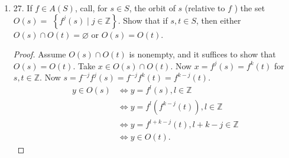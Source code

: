 \begin{enumerate}[resume]
\begin{lemma}
	\begin{proof}[Proof of lemma]
	We pick an element $x \in S$ and find a closed orbit \[
	R_f(x) := \{f^k x: k \in \mathbb{Z}, k \ge 0\} \subset S
	.\] 
	$R_f(x)$ is nonempty since $x \in R_f(x)$. We may repeat the process with $S\setminus R_f(x)$ instead of $S$. The process must terminate because $S$ is finite and we take away at least one element in each repetition.
 	\end{proof}
	\end{lemma}
	\begin{lemma}
	For any element $f$ in $A(R)$ where $|R| = n$, if $R$ is a closed orbit wrt $f$, $f$ can be decomposed into product of precisely $n-1$ transpositions.
	\begin{proof}[Proof of lemma]
	Fix some $x \in R$, and make the list
	\[
		\left( x, fx, f^2 x, \ldots, f^{n-1}x \right)
	.\]
	By properties of closed orbit, this is an exhaustive list of elements in $R$. Now we perform these $n-1$ transpositions sequentially:
	\[
		\left( 1\leftrightarrow 2 \right),
		\left( 1\leftrightarrow 3 \right),
		\ldots,
		\left( 1\leftrightarrow n \right)
	,\] where we use integer to represent location on the list. After the first transposition, $x$ moves to the second place, undisturbed thereafter. After $n-1$ transpositions, $n-1$ elements have moved to the right spot, and the last item automatically stays at where it belongs.
 	\end{proof}
	\end{lemma}
\begin{proof}
	Apply the two lemmas above.
\end{proof}
	\item 27. If $f \in A(S)$, call, for $s \in S$, the orbit of $s$ (relative to $f$ ) the set $O(s)=$ $\left\{f^{j}(s) \mid j \in \mathbb{Z}\right\}$. Show that if $s, t \in S$, then either $O(s) \cap O(t)=\varnothing$ or $O(s)=O(t)$.
\begin{proof}
Assume $O(s) \cap O(t)$ is nonempty, and it suffices to show that $O(s) = O(t)$. Take $x \in O(s) \cap O(t)$. Now $x = f^j(s) = f^k(t)$  for $s, t \in  \mathbb{Z}$. Now $s = f^{-j }f^j(s) = f^{-j }f^k(t) = f^{k-j }(t)$. 
\begin{align*}
	y \in O(s) &\iff y = f^l(s), l \in \mathbb{Z}\\
	&\iff y = f^l(f^{k-j}(t)), l \in \mathbb{Z}\\
	&\iff y = f^{l+k-j}(t), l+k-j \in \mathbb{Z}\\
	&\iff y \in  O(t)
.\end{align*}
\end{proof}
\end{enumerate}
